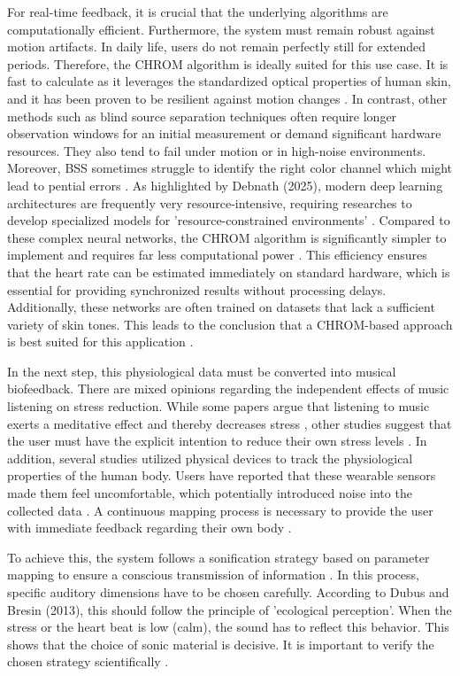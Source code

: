 For real-time feedback, it is crucial that the underlying algorithms are computationally efficient. Furthermore, the system must remain robust against motion artifacts. In daily life, users do not remain perfectly still for extended periods. Therefore, the CHROM algorithm is ideally suited for this use case. It is fast to calculate as it leverages the standardized optical properties of human skin, and it has been proven to be resilient against motion changes \cite{dehaan2013chrom}. In contrast, other methods such as blind source separation techniques often require longer observation windows for an initial measurement or demand significant hardware resources. They also tend to fail under motion or in high-noise environments. Moreover, BSS sometimes struggle to identify the right color channel which might lead to pential errors \cite{poh2010non}. As highlighted by Debnath (2025), modern deep learning architectures are frequently very resource-intensive, requiring researches to develop specialized models for 'resource-constrained environments' \cite{Debnath25}. Compared to these complex neural networks, the CHROM algorithm is significantly simpler to implement and requires far less computational power \cite{dehaan2013chrom}. This efficiency ensures that the heart rate can be estimated immediately on standard hardware, which is essential for providing synchronized results without processing delays. Additionally, these networks are often trained on datasets that lack a sufficient variety of skin tones. This leads to the conclusion that a CHROM-based approach is best suited for this application \cite{Debnath25}.

In the next step, this physiological data must be converted into musical biofeedback. There are mixed opinions regarding the independent effects of music listening on stress reduction. While some papers argue that listening to music exerts a meditative effect and thereby decreases stress \cite{bernardi2006cardiovascular}, other studies suggest that the user must have the explicit intention to reduce their own stress levels \cite{linnemann2015music}. In addition, several studies utilized physical devices to track the physiological properties of the human body. Users have reported that these wearable sensors made them feel uncomfortable, which potentially introduced noise into the collected data \cite{pelletier2004effect}. A continuous mapping process is necessary to provide the user with immediate feedback regarding their own body \cite{dubus2013systematic}.

To achieve this, the system follows a sonification strategy based on parameter mapping to ensure a conscious transmission of information \cite{dubus2013systematic}. In this process, specific auditory dimensions have to be chosen carefully. According to Dubus and Bresin (2013), this should follow the principle of 'ecological perception'. When the stress or the heart beat is low (calm), the sound has to reflect this behavior. This shows that the choice of sonic material is decisive. It is important to verify the chosen strategy scientifically \cite{dubus2013systematic}.

